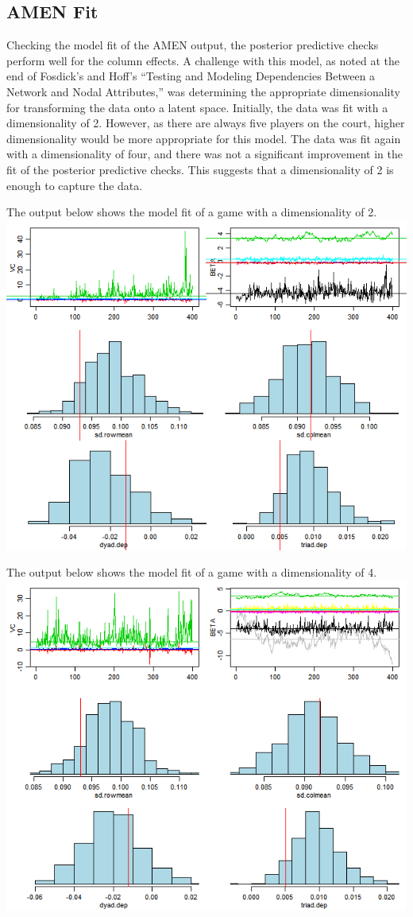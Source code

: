 \documentclass[12pt,twoside]{dukestatscithesis}
\theoremstyle{definition}
\theoremstyle{definition}
\theoremstyle{definition}
\theoremstyle{remark}
\begin{document}
\subsection{AMEN Fit}\label{amen-fit}

Checking the model fit of the AMEN output, the posterior predictive
checks perform well for the column effects. A challenge with this model,
as noted at the end of Fosdick's and Hoff's ``Testing and Modeling
Dependencies Between a Network and Nodal Attributes,'' was determining
the appropriate dimensionality for transforming the data onto a latent
space. Initially, the data was fit with a dimensionality of 2. However,
as there are always five players on the court, higher dimensionality
would be more appropriate for this model. The data was fit again with a
dimensionality of four, and there was not a significant improvement in
the fit of the posterior predictive checks. This suggests that a
dimensionality of 2 is enough to capture the data.

The output below shows the model fit of a game with a dimensionality of
2. \includegraphics{img/amenoutput.png}

The output below shows the model fit of a game with a dimensionality of
4. \includegraphics{img/amenoutput4.png}
\end{document}
